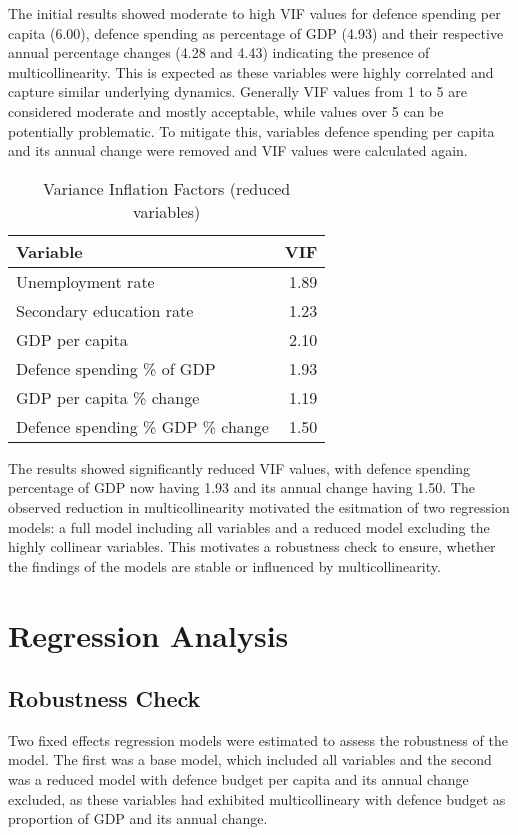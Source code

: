 The initial results showed moderate to high VIF values for defence spending per capita (6.00), 
defence spending as percentage of GDP (4.93) and their respective annual percentage changes (4.28 and 4.43)
indicating the presence of multicollinearity. This is expected as these variables were highly correlated 
and capture similar underlying dynamics.
Generally VIF values from 1 to 5 are considered 
moderate and mostly acceptable, while values over 5 can be potentially problematic. To mitigate 
this, variables defence spending per capita and its annual change were removed and VIF values 
were calculated again.

\begin{table}[ht]
\small
\centering
\caption{Variance Inflation Factors (reduced variables)}
\begin{tabularx}{\textwidth}{l r}
\toprule
\textbf{Variable} & \textbf{VIF} \\
\midrule
Unemployment rate & 1.89 \\
Secondary education rate & 1.23 \\
GDP per capita & 2.10 \\
Defence spending \% of GDP & 1.93 \\
GDP per capita \% change & 1.19 \\
Defence spending \% GDP \% change & 1.50 \\
\bottomrule
\end{tabularx}
\label{tab:multicollinearity_reduced}
\end{table}

The results showed significantly reduced VIF values, with defence spending percentage of GDP now having 
1.93 and its annual change having 1.50. The observed reduction in multicollinearity motivated the 
esitmation of two regression models: a full model including all variables and a reduced model 
excluding the highly collinear variables. This motivates a robustness check to ensure, whether 
the findings of the models are stable or influenced by multicollinearity.

\section{Regression Analysis}

\subsection{Robustness Check}

Two fixed effects regression models were estimated to assess the robustness of the model. 
The first was a base model, 
which included all variables and the second was a reduced model with defence budget 
per capita and its annual change excluded, as these variables had exhibited multicollineary 
with defence budget as proportion of GDP and its annual change.

